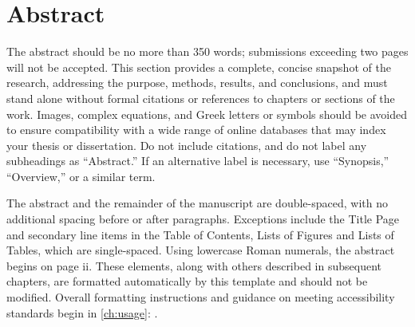 \chapter*{Abstract}

The abstract should be no more than 350 words; submissions exceeding two pages will not be accepted.
This section provides a complete, concise snapshot of the research, addressing the purpose, methods, results, and conclusions, and must stand alone without formal citations or references to chapters or sections of the work.
Images, complex equations, and Greek letters or symbols should be avoided to ensure compatibility with a wide range of online databases that may index your thesis or dissertation.
Do not include citations, and do not label any subheadings as ``Abstract.”
If an alternative label is necessary, use ``Synopsis,” ``Overview,” or a similar term.

The abstract and the remainder of the manuscript are double-spaced, with no additional spacing before or after paragraphs.
Exceptions include the Title Page and secondary line items in the Table of Contents, Lists of Figures and Lists of Tables, which are single-spaced.
Using lowercase Roman numerals, the abstract begins on page ii.
These elements, along with others described in subsequent chapters, are formatted automatically by this template and should not be modified.
Overall formatting instructions and guidance on meeting accessibility standards begin in \autoref{ch:usage}: .
